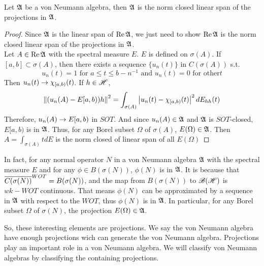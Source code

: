 \documentclass[a4paper,11pt]{report}
\begin{document}
\begin{thm}
	Let $\mathfrak{A}$ be a von Neumann algebra, then $\mathfrak{A}$ is the norm closed linear span of the projections in $\mathfrak{A}$.
\end{thm}
\begin{proof}
	Since $\mathfrak{A}$ is the linear span of $\operatorname{Re}{\mathfrak{A}}$, we just need to show $\operatorname{Re}{\mathfrak{A}}$ is the norm closed linear span of the projections in $\mathfrak{A}$.\\
	Let $A \in \operatorname{Re}{\mathfrak{A}}$ with the spectral measure $E$. $E$ is defined on $\sigma(A)$. If $[a,b] \subset \sigma(A)$, then there exists a sequence $\{u_n(t)\}$ in $C(\sigma(A))$ s.t.
	\begin{equation*}
		u_n(t) = 1 \text{ for } a \leqslant t \leqslant b-n^{-1} \text{ and } u_n(t) = 0 \text{ for other} t
	\end{equation*}
	Then $u_n(t) \rightarrow \chi_{[a,b)}(t)$. If $h \in \mathscr{H}$,
	\begin{equation*}
		\left\lVert(u_n(A)-E[a,b))h\right\lVert^2 = \int_{\sigma(A)} \left\lvert u_n(t)-\chi_{[a,b)}(t)\right\lvert^2 dE_{hh}(t)
	\end{equation*}
	Therefore, $u_n(A) \rightarrow E[a,b)$ in $SOT$. And since $u_n(A) \in \mathfrak{A}$ and $\mathfrak{A}$ is $SOT$-closed, $E[a,b)$ is in $\mathfrak{A}$. Thus, for any Borel subset $\Omega$ of $\sigma(A)$, $E(\Omega) \in \mathfrak{A}$. Then $A = \int_{\sigma(A)} t dE$ is the norm closed of linear span of all $E(\Omega)$
\end{proof}
\begin{rem}
	In fact, for any normal operator $N$ in a von Neumann algebra $\mathfrak{A}$ with the spectral measure $E$ and for any $\phi \in B(\sigma(N))$, $\phi(N)$ is in $\mathfrak{A}$. It is because that $\overline{C(\sigma(N))}^{WOT} = B(\sigma(N))$, and the map from $B(\sigma(N))$ to $\mathscr{B(H)}$ is $wk-WOT$ continuous. That means $\phi(N)$ can be approximated by a sequence in $\mathfrak{A}$ with respect to the $WOT$, thus $\phi(N)$ is in $\mathfrak{A}$. In particular, for any Borel subset $\Omega$ of $\sigma(N)$, the projection $E(\Omega) \in \mathfrak{A}$.
\end{rem}

So, these interesting elements are projections. We say the von Neumann algebra have enough projections wich can generate the von Neumann algebra. Projections play an important role in a von Neumann algebra. We will classify von Neumann algebras by classifying the containing projections.
\end{document}
